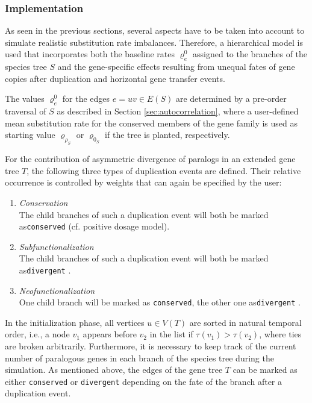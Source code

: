 \documentclass[hidelinks,11pt]{scrreprt}
\begin{document}
\subsubsection{Implementation}\label{sec:imbalancing_implementation}

As seen in the previous sections, several aspects have to be taken into account to simulate realistic substitution rate imbalances. Therefore, a hierarchical model is used that incorporates both the baseline rates $\varrho^0_e$ assigned to the branches of the species tree $S$ and the gene-specific effects resulting from unequal fates of gene copies after duplication and horizontal gene transfer events.

The values $\varrho^0_e$ for the edges $e=uv \in E(S)$ are determined by a pre-order traversal of $S$ as described in Section \ref{sec:autocorrelation}, where a user-defined mean substitution rate for the conserved members of the gene family is used as starting value $\varrho_{\rho_S}$ or $\varrho_{0_S}$ if the tree is planted, respectively.

For the contribution of asymmetric divergence of paralogs in an extended gene tree $T$, the following three types of duplication events are defined. Their relative occurrence is controlled by weights that can again be specified by the user:
\renewcommand{\labelenumi}{\roman{enumi})}
\begin{enumerate}
	\item \textit{Conservation}\\
	The child branches of such a duplication event will both be marked as\newline \texttt{conserved} (cf. positive dosage model).
	\item \textit{Subfunctionalization}\\
	The child branches of such a duplication event will both be marked as\newline \texttt{divergent} \citep[cf. DDC model by][]{force1999}.
	\item \textit{Neofunctionalization}\\
	One child branch will be marked as \texttt{conserved}, the other one as\newline \texttt{divergent} \citep[cf. neofunctionalization model by][]{ohno1970}.
\end{enumerate}

In the initialization phase, all vertices $u \in V(T)$ are sorted in natural temporal order, i.e., a node $v_1$ appears before $v_2$ in the list if $\tau(v_1) > \tau(v_2)$, where ties are broken arbitrarily. Furthermore, it is necessary to keep track of the current number of paralogous genes in each branch of the species tree during the simulation. As mentioned above, the edges of the gene tree $T$ can be marked as either \texttt{conserved} or \texttt{divergent} depending on the fate of the branch after a duplication event.
\end{document}
